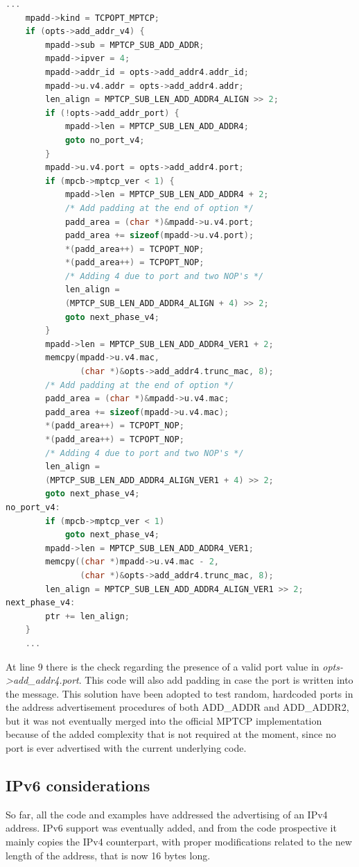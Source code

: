 \begin{lstlisting}[language=c, caption=\textit{Code to write the outgoing ADD\_ADDR(2) packet, with added support for the port value}, label=outport]
	...
	mpadd->kind = TCPOPT_MPTCP;
	if (opts->add_addr_v4) {
		mpadd->sub = MPTCP_SUB_ADD_ADDR;
		mpadd->ipver = 4;
		mpadd->addr_id = opts->add_addr4.addr_id;
		mpadd->u.v4.addr = opts->add_addr4.addr;
		len_align = MPTCP_SUB_LEN_ADD_ADDR4_ALIGN >> 2;
		if (!opts->add_addr_port) {
			mpadd->len = MPTCP_SUB_LEN_ADD_ADDR4;
			goto no_port_v4;
		}
		mpadd->u.v4.port = opts->add_addr4.port;
		if (mpcb->mptcp_ver < 1) {
			mpadd->len = MPTCP_SUB_LEN_ADD_ADDR4 + 2;
			/* Add padding at the end of option */
			padd_area = (char *)&mpadd->u.v4.port;
			padd_area += sizeof(mpadd->u.v4.port);
			*(padd_area++) = TCPOPT_NOP;
			*(padd_area++) = TCPOPT_NOP;
			/* Adding 4 due to port and two NOP's */
			len_align =
			(MPTCP_SUB_LEN_ADD_ADDR4_ALIGN + 4) >> 2;
			goto next_phase_v4;
		}
		mpadd->len = MPTCP_SUB_LEN_ADD_ADDR4_VER1 + 2;
		memcpy(mpadd->u.v4.mac,
		       (char *)&opts->add_addr4.trunc_mac, 8);
		/* Add padding at the end of option */
		padd_area = (char *)&mpadd->u.v4.mac;
		padd_area += sizeof(mpadd->u.v4.mac);
		*(padd_area++) = TCPOPT_NOP;
		*(padd_area++) = TCPOPT_NOP;
		/* Adding 4 due to port and two NOP's */
		len_align =
		(MPTCP_SUB_LEN_ADD_ADDR4_ALIGN_VER1 + 4) >> 2;
		goto next_phase_v4;
no_port_v4:
		if (mpcb->mptcp_ver < 1)
			goto next_phase_v4;
		mpadd->len = MPTCP_SUB_LEN_ADD_ADDR4_VER1;
		memcpy((char *)mpadd->u.v4.mac - 2,
		       (char *)&opts->add_addr4.trunc_mac, 8);
		len_align = MPTCP_SUB_LEN_ADD_ADDR4_ALIGN_VER1 >> 2;
next_phase_v4:
		ptr += len_align;
	}
	...
\end{lstlisting}

At line 9 there is the check regarding the presence of a valid port value in \textit{opts->add\_addr4.port}. This code will also add padding in case the port is written into the message. This solution have been adopted to test random, hardcoded ports in the address advertisement procedures of both ADD\_ADDR and ADD\_ADDR2, but it was not eventually merged into the official MPTCP implementation because of the added complexity that is not required at the moment, since no port is ever advertised with the current underlying code.


\subsection{IPv6 considerations}
So far, all the code and examples have addressed the advertising of an IPv4 address. IPv6 support was eventually added, and from the code prospective it mainly copies the IPv4 counterpart, with proper modifications related to the new length of the address, that is now 16 bytes long. 



